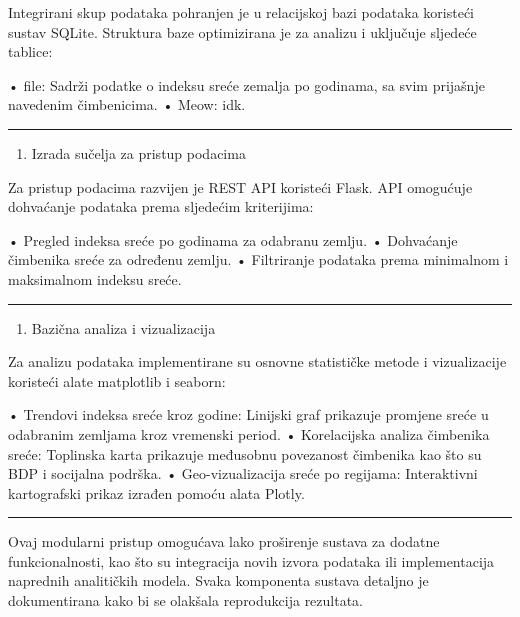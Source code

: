 \documentclass[11pt]{article}
\providecommand{\tightlist}{%
      \setlength{\itemsep}{0pt}\setlength{\parskip}{0pt}}
\begin{document}
Integrirani skup podataka pohranjen je u relacijskoj bazi podataka
koristeći sustav SQLite. Struktura baze optimizirana je za analizu i
uključuje sljedeće tablice:

• file: Sadrži podatke o indeksu sreće zemalja po godinama, sa svim
prijašnje navedenim čimbenicima. • Meow: idk.

\begin{center}\rule{0.5\linewidth}{0.5pt}\end{center}

\begin{enumerate}
\def\labelenumi{\arabic{enumi}.}
\setcounter{enumi}{3}
\tightlist
\item
  Izrada sučelja za pristup podacima
\end{enumerate}

Za pristup podacima razvijen je REST API koristeći Flask. API omogućuje
dohvaćanje podataka prema sljedećim kriterijima:

• Pregled indeksa sreće po godinama za odabranu zemlju. • Dohvaćanje
čimbenika sreće za određenu zemlju. • Filtriranje podataka prema
minimalnom i maksimalnom indeksu sreće.

\begin{center}\rule{0.5\linewidth}{0.5pt}\end{center}

\begin{enumerate}
\def\labelenumi{\arabic{enumi}.}
\setcounter{enumi}{4}
\tightlist
\item
  Bazična analiza i vizualizacija
\end{enumerate}

Za analizu podataka implementirane su osnovne statističke metode i
vizualizacije koristeći alate matplotlib i seaborn:

• Trendovi indeksa sreće kroz godine: Linijski graf prikazuje promjene
sreće u odabranim zemljama kroz vremenski period. • Korelacijska analiza
čimbenika sreće: Toplinska karta prikazuje međusobnu povezanost
čimbenika kao što su BDP i socijalna podrška. • Geo-vizualizacija sreće
po regijama: Interaktivni kartografski prikaz izrađen pomoću alata
Plotly.

\begin{center}\rule{0.5\linewidth}{0.5pt}\end{center}

Ovaj modularni pristup omogućava lako proširenje sustava za dodatne
funkcionalnosti, kao što su integracija novih izvora podataka ili
implementacija naprednih analitičkih modela. Svaka komponenta sustava
detaljno je dokumentirana kako bi se olakšala reprodukcija rezultata.
\end{document}
